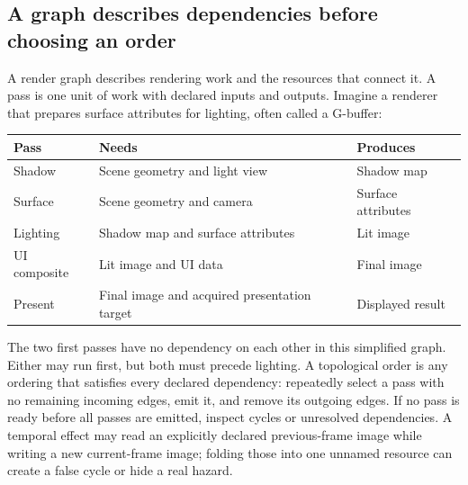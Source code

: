 \subsection{A graph describes dependencies before choosing an order}\label{06-engine-ii-ch026-a-graph-describes-dependencies-before-choosing-an-order}

\hypertarget{06-engine-ii-ch026-a-graph-describes-dependencies-before-choosing-an-order}{}

A render graph describes rendering work and the resources that connect it. A pass is one unit of work with declared inputs and outputs. Imagine a renderer that prepares surface attributes for lighting, often called a G-buffer:

{\def\LTcaptype{none} %
\begin{longtable}[]{@{}
  >{\raggedright\arraybackslash}p{}
  >{\raggedright\arraybackslash}p{}
  >{\raggedright\arraybackslash}p{}@{}}
\toprule\noalign{}
\begin{minipage}[b]{\linewidth}\raggedright
Pass
\end{minipage} & \begin{minipage}[b]{\linewidth}\raggedright
Needs
\end{minipage} & \begin{minipage}[b]{\linewidth}\raggedright
Produces
\end{minipage} \\
\midrule\noalign{}
\endhead
\bottomrule\noalign{}
\endlastfoot
Shadow & Scene geometry and light view & Shadow map \\
Surface & Scene geometry and camera & Surface attributes \\
Lighting & Shadow map and surface attributes & Lit image \\
UI composite & Lit image and UI data & Final image \\
Present & Final image and acquired presentation target & Displayed result \\
\end{longtable}
}


The two first passes have no dependency on each other in this simplified graph. Either may run first, but both must precede lighting. A topological order is any ordering that satisfies every declared dependency: repeatedly select a pass with no remaining incoming edges, emit it, and remove its outgoing edges. If no pass is ready before all passes are emitted, inspect cycles or unresolved dependencies. A temporal effect may read an explicitly declared previous-frame image while writing a new current-frame image; folding those into one unnamed resource can create a false cycle or hide a real hazard.

